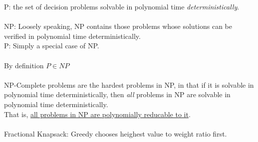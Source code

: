 \documentclass[8pt,letterpaper,twocolumn]{article}
\begin{document}
\textbullet P: the set of decision problems solvable in polynomial time \emph{deterministically}.\\
\\
NP: Loosely speaking, NP contains those problems whose solutions can be verified in polynomial time deterministically.\\
P: Simply a special case of NP.\\
\\
\textbullet By definition $P \in NP$\\
\\
NP-Complete problems are the hardest problems in NP, in that if it is solvable in polynomial time deterministically,
then \emph{all} problems in NP are solvable in polynomial time deterministically.\\
That is, \underline{all problems in NP are polynomially reducable to it}.\\
\\
\textbullet Fractional Knapsack: Greedy chooses heighest value to weight ratio first.\\
\end{document}
